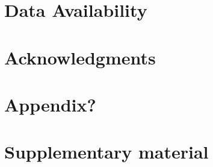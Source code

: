 

\section*{Data Availability}



\section*{Acknowledgments}





\clearpage
\setcounter{table}{0}
\renewcommand{\thetable}{S\arabic{table}}
\setcounter{figure}{0}
\renewcommand{\thefigure}{S\arabic{figure}}
\setcounter{section}{1}
\renewcommand \thesection{S\arabic{section}}

\section*{Appendix?}



\section*{Supplementary material}



